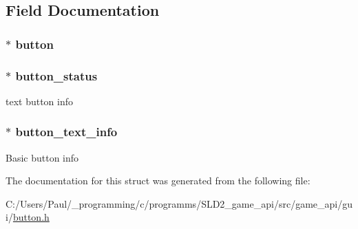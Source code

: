 \subsection{Field Documentation}
\hypertarget{struct___text___button_afcbb5b54142bac4e305b31cbebe41064}{
\subsubsection[{button}]{$\ast$ button}}\label{struct___text___button_afcbb5b54142bac4e305b31cbebe41064}
\hypertarget{struct___text___button_af1ab6c7287e67a55a8e855e08302f8be}{
\subsubsection[{button\+\_\+status}]{$\ast$ button\+\_\+status}}\label{struct___text___button_af1ab6c7287e67a55a8e855e08302f8be}
text button info \hypertarget{struct___text___button_ab64035e509bab4503a5e1798bcd3d94f}{
\subsubsection[{button\+\_\+text\+\_\+info}]{$\ast$ button\+\_\+text\+\_\+info}}\label{struct___text___button_ab64035e509bab4503a5e1798bcd3d94f}
Basic button info 

The documentation for this struct was generated from the following file\+:\begin{DoxyCompactItemize}
\item 
C\+:/\+Users/\+Paul/\+\_\+programming/c/programms/\+S\+L\+D2\+\_\+game\+\_\+api/src/game\+\_\+api/gui/\hyperlink{button_8h}{button.\+h}\end{DoxyCompactItemize}
